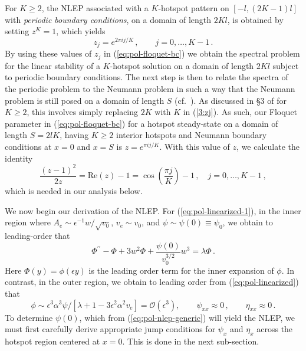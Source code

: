 \documentclass{article}%
\begin{document}
For $K\geq 2$, the NLEP associated with a $K$-hotspot pattern on
$[-l,(2K-1)l]$ with {\em periodic boundary conditions}, on a domain of
length $2Kl$, is obtained by setting $z^K=1$, which yields
\begin{equation}
    z_j = e^{2\pi i j/K} \,, \qquad j=0,\ldots,K-1 \,. \label{3:zj}
\end{equation}
By using these values of $z_j$ in (\ref{eq:pol-floquet-bc}) we 
obtain the spectral problem for the linear stability of a $K$-hotspot
solution on a domain of length $2Kl$ subject to periodic boundary
conditions. The next step is then to relate the spectra of the
periodic problem to the Neumann problem in such a way that the Neumann
problem is still posed on a domain of length $S$ (cf.~\cite{kww_crime}). As
discussed in \S 3 of \cite{kww_crime} for $K\geq 2$, this involves
simply replacing $2K$ with $K$ in (\ref{3:zj}).  As such, our Floquet
parameter in (\ref{eq:pol-floquet-bc}) for a hotspot steady-state on a
domain of length $S=2lK$, having $K\geq 2$ interior hotspots and
Neumann boundary conditions at $x=0$ and $x=S$ is $z=e^{\pi i
  j/K}$. With this value of $z$, we calculate the identity
\begin{equation}\label{3:ziden}
    \frac{(z-1)^2}{2 z} = \mbox{Re}(z)-1 = 
\cos\left(\frac{\pi j}{K}\right) - 1 \,, \quad j=0,\ldots,K-1 \,,
\end{equation}
which is needed in our analysis below.

We now begin our derivation of the NLEP. For
(\ref{eq:pol-linearized-1}), in the inner region where
$A_{e}\sim \epsilon^{-1} {w/\sqrt{v_0}}$, $v_e\sim v_0$, and 
$\psi\sim \psi(0)\equiv \psi_{0}$, we obtain to leading-order that
\begin{equation}
\Phi^{\prime\prime}-\Phi+3w^{2}\Phi+\frac{\psi(0)}{v_{0}^{3/2}}w^{3}=\lambda\Phi\,.
\label{eq:pol-nlep-generic}
\end{equation}
Here $\Phi(y)=\phi(\epsilon y)$ is the leading order term for the
inner expansion of $\phi$. In contrast, in the outer region, we obtain
to leading order from (\ref{eq:pol-linearized}) that 
\begin{equation}
\phi\sim\epsilon^{3}\alpha^{3}\psi/[\lambda+1-3\epsilon^{2}\alpha^{2}v_{e}]=
{\mathcal O}(\epsilon^{3}),\qquad\psi_{xx}\approx 0\,,\qquad\eta_{xx}\approx 0\,.
\label{stab:phi_out}
\end{equation}
To determine $\psi(0)$, which from (\ref{eq:pol-nlep-generic}) will yield 
the NLEP, we must first carefully derive appropriate jump conditions for
$\psi_x$ and $\eta_x$ across the hotspot region centered at $x=0$.
This is done in the next sub-section.
\end{document}
